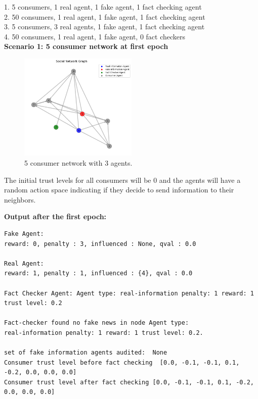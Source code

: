 \documentclass[twoside]{article}
\begin{document}
1. 5 consumers, 1 real agent, 1 fake agent, 1 fact checking agent\\
2. 50 consumers, 1 real agent, 1 fake agent, 1 fact checking agent\\
3. 5 consumers, 3 real agents, 1 fake agent, 1 fact checking agent\\
4. 50 consumers, 1 real agent, 1 fake agent, 0 fact checkers\\

\textbf{Scenario 1: 5 consumer network at first epoch}

\begin{figure}[htbp]
     \centering
     \includegraphics[width=0.5\textwidth]{../results/images/Initial_network.png}
     \caption{5 consumer network with 3 agents.}
     \label{fig: 5 consumer network, 3 agents}
 \end{figure}
 

 The initial trust levels for all consumers will be 0 and the agents will have a random action space indicating if they decide to send information to their neighbors. 

\pagebreak
\textbf{Output after the first epoch:}

\begin{verbatim}
Fake Agent: 
reward: 0, penalty : 3, influenced : None, qval : 0.0

Real Agent: 
reward: 1, penalty : 1, influenced : {4}, qval : 0.0

Fact Checker Agent: Agent type: real-information penalty: 1 reward: 1 trust level: 0.2

Fact-checker found no fake news in node Agent type: 
real-information penalty: 1 reward: 1 trust level: 0.2.

set of fake information agents audited:  None
Consumer trust level before fact checking  [0.0, -0.1, -0.1, 0.1, -0.2, 0.0, 0.0, 0.0]
Consumer trust level after fact checking [0.0, -0.1, -0.1, 0.1, -0.2, 0.0, 0.0, 0.0]

\end{verbatim}
\end{document}
